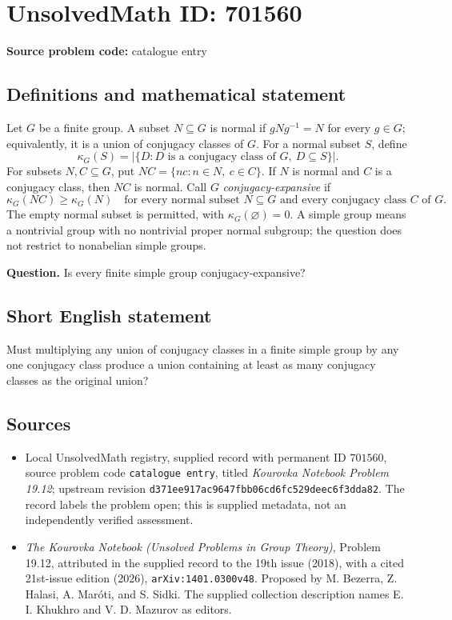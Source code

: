\documentclass[11pt]{article}
\begin{document}
\section*{UnsolvedMath ID: 701560}
\textbf{Source problem code:} catalogue entry
\subsection{Definitions and mathematical statement}
Let \(G\) be a finite group. A subset \(N\subseteq G\) is normal if \(gNg^{-1}=N\) for every \(g\in G\); equivalently, it is a union of conjugacy classes of \(G\). For a normal subset \(S\), define
\[
\kappa_G(S)=\bigl|\{D:D\text{ is a conjugacy class of }G,\ D\subseteq S\}\bigr|.
\]
For subsets \(N,C\subseteq G\), put \(NC=\{nc:n\in N,\ c\in C\}\). If \(N\) is normal and \(C\) is a conjugacy class, then \(NC\) is normal. Call \(G\) \emph{conjugacy-expansive} if
\[
\kappa_G(NC)\geq\kappa_G(N)
\quad\text{for every normal subset }N\subseteq G
\text{ and every conjugacy class }C\text{ of }G.
\]
The empty normal subset is permitted, with \(\kappa_G(\varnothing)=0\). A simple group means a nontrivial group with no nontrivial proper normal subgroup; the question does not restrict to nonabelian simple groups.

\textbf{Question.} Is every finite simple group conjugacy-expansive?
\subsection{Short English statement}
Must multiplying any union of conjugacy classes in a finite simple group by any one conjugacy class produce a union containing at least as many conjugacy classes as the original union?
\subsection{Sources}
\begin{itemize}
\item Local UnsolvedMath registry, supplied record with permanent ID \(701560\), source problem code \texttt{catalogue entry}, titled \emph{Kourovka Notebook Problem 19.12}; upstream revision \texttt{d371ee917ac9647fbb06cd6fc529deec6f3dda82}. The record labels the problem open; this is supplied metadata, not an independently verified assessment.
\item \emph{The Kourovka Notebook (Unsolved Problems in Group Theory)}, Problem 19.12, attributed in the supplied record to the 19th issue (2018), with a cited 21st-issue edition (2026), \texttt{arXiv:1401.0300v48}. Proposed by M. Bezerra, Z. Halasi, A. Mar\'oti, and S. Sidki. The supplied collection description names E. I. Khukhro and V. D. Mazurov as editors.
\end{itemize}
\end{document}
